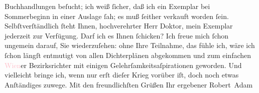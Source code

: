                     Buchhandlungen beſucht; ich weiß ſicher, daß ich ein Exemplar bei Sommerbeginn
                    in einer Auslage ſah; es muß ſeither verkauft worden ſein. Selbſtverſtändlich
                    ſteht Ihnen, hochverehrter Herr Doktor, mein Exemplar jederzeit zur Verfügung.
                    Darf ich es Ihnen ſchicken?\pend
           \pstart
           Ich freue mich ſchon ungemein darauf, Sie wiederzuſehen: ohne Ihre Teilnahme, das
                    fühle ich, wäre ich ſchon längſt entmutigt von allen Dichterplänen abgekommen
                    und zum einfachen \textcolor{pink}{Wien}{}\ledrightnote{\textcolor{pink}{Wien}}er Bezirksrichter mit
                    einigen Gelehrſamkeitsaſpirationen geworden. Und vielleicht bringe ich, wenn nur
                    erſt dieſer Krieg vorüber iſt, doch noch etwas Anſtändiges zuwege.\pend
           \pstart
           Mit den freundlichſten Grüßen Ihr ergebener\pend
           \pstart \spacefill\mbox{Robert Adam}\pend{}\endnumbering{}  
      